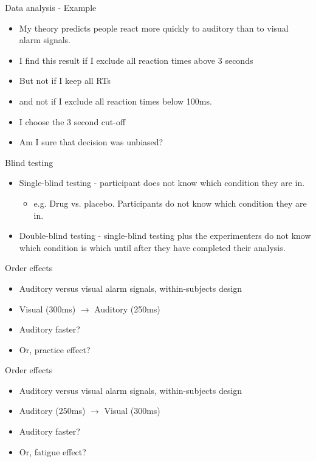 \documentclass{beamer}
\begin{document}
\begin{frame}{Data analysis - Example }
\begin{itemize}
\item My theory predicts people react more quickly to auditory than to visual alarm signals.
\item I find this result if I exclude all reaction times above 3 seconds
\item But not if I keep all RTs
\item and not if I exclude all reaction times below 100ms.
\item I choose the 3 second cut-off
\item Am I sure that decision was unbiased?
\end{itemize}
\end{frame}

\begin{frame}{Blind testing}
\begin{itemize}
\item Single-blind testing - participant does not know which condition they are in. 
\begin{itemize}
\item e.g. Drug vs. placebo. Participants do not know which condition they are in. 
\end{itemize}
\item Double-blind testing - single-blind testing plus the experimenters do not know which condition is which until after they have completed their analysis.
\end{itemize}
\end{frame}

\begin{frame}{Order effects}
\begin{itemize}
\item Auditory versus visual alarm signals, within-subjects design
\item Visual (300ms) $\to$ Auditory (250ms)
\item Auditory faster?
\item Or, practice effect?
\end{itemize}
\end{frame}

\begin{frame}{Order effects}
\begin{itemize}
\item Auditory versus visual alarm signals, within-subjects design
\item Auditory (250ms) $\to$ Visual (300ms)
\item Auditory faster?
\item Or, fatigue effect?
\end{itemize}
\end{frame}
\end{document}
